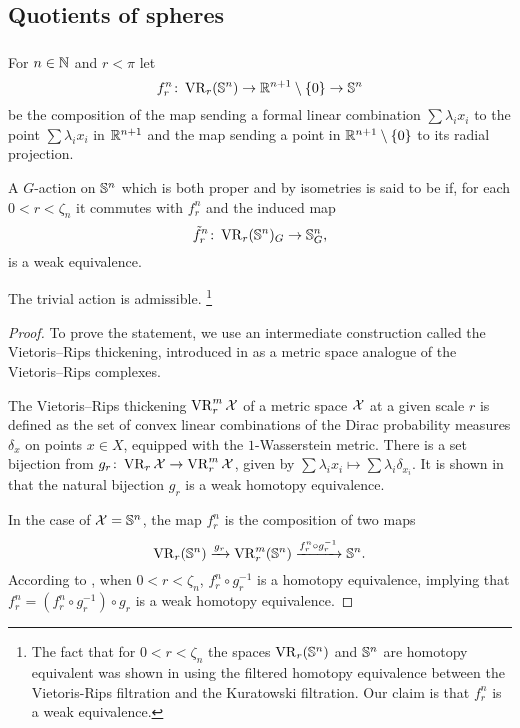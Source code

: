 \subsection{Quotients of spheres}

\subsubsection{}\label{subsub:f}

For \(n \in \mathbb{N}\) and \(r < \pi\) let
\[
f_r^n \colon \operatorname{VR}_r(\mathbb{S}^n) \to \mathbb{R}^{n+1} \setminus \{0\} \to \mathbb{S}^n
\]
be the composition of the map sending a formal linear combination $\sum\lambda_i x_i$ to the point \(\sum\lambda_i x_i\) in \(\mathbb{R}^{n+1}\) and the map sending a point in \(\mathbb{R}^{n+1} \setminus \{0\}\) to its radial projection.

A \(G\)-action on \(\mathbb{S}^n\) which is both proper and by isometries is said to be  if, for each $0 < r < \zeta_n$ it commutes with \(f_r^n\) and the induced map
\[
\tilde f_r^n \colon \operatorname{VR}_r(\mathbb{S}^n)_G \to \mathbb{S}^n_G,
\]
is a weak equivalence.

\medskip\lemma
The trivial action is admissible.
\footnote{The fact that for $0 < r < \zeta_n$ the spaces $\operatorname{VR}_r(\mathbb{S}^n)$ and $\mathbb{S}^n$ are homotopy equivalent was shown in \cite[Theorem 7.1]{lim2020vietoris} using the filtered homotopy equivalence between the Vietoris-Rips filtration and the Kuratowski filtration. Our claim is that $f_r^n$ is a weak equivalence.}

\begin{proof}
	To prove the statement, we use an intermediate construction called the Vietoris--Rips thickening, introduced in \cite{adamaszek2018metric} as a metric space analogue of the Vietoris--Rips complexes.

	The Vietoris--Rips thickening $\operatorname{VR}_r^m\mathcal{X}$ of a metric space $\mathcal{X}$ at a given scale $r$ is defined as the set of convex linear combinations of the Dirac probability measures $\delta_{x}$ on points $x \in X$, equipped with the $1$-Wasserstein metric.
	There is a set bijection from $g_r \colon \operatorname{VR}_r\mathcal{X} \to \operatorname{VR}_r^m\mathcal{X}$, given by $\sum \lambda_i x_i \mapsto \sum \lambda_i \delta_{x_i}.$
	It is shown in \cite[Theorem 1]{gillespie2024vietoris} that the natural bijection $g_r$ is a weak homotopy equivalence.

	In the case of $\mathcal{X} = \mathbb{S}^n$, the map $f_r^n$ is the composition of two maps
	\[
	\operatorname{VR}_r(\mathbb{S}^n) \xrightarrow{g_r} \operatorname{VR}_r^m(\mathbb{S}^n) \xrightarrow{f_r^n \circ g_r^{-1}} \mathbb{S}^n.
	\]
	According to \cite[Proposition 5.3]{adamaszek2018metric}, when $0<r<\zeta_n$, $f_r^n \circ g_r^{-1}$ is a homotopy equivalence, implying that $f_r^n = (f_r^n \circ g_r^{-1}) \circ g_r$ is a weak homotopy equivalence.
\end{proof}

